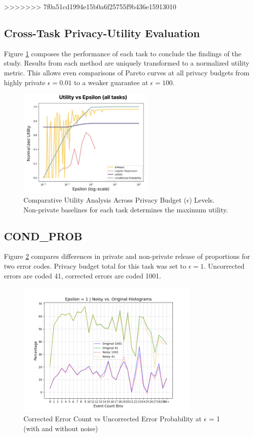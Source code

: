 \documentclass[12pt,letterpaper]{article}
\begin{document}
>>>>>>> 7f0a51cd1994e15b0a6f25755f9b436e15913010

\subsection{Cross-Task Privacy-Utility Evaluation}

Figure \ref{fig:meta} composes the performance of each task to conclude the findings of the study. Results from each method are uniquely transformed to a normalized utility metric. This allows even comparisons of Pareto curves at all privacy budgets from highly private $\epsilon=0.01$ to a weaker guarantee at $\epsilon=100$.

\begin{figure}[H]
  \centering
  \includegraphics[width=0.6\textwidth]{figure/meta.png}
  \caption{Comparative Utility Analysis Across Privacy Budget ($\epsilon$) Levels. Non-private baselines for each task determines the maximum utility.}
  \label{fig:meta}
\end{figure}

\subsection{COND\_PROB}

Figure \ref{fig:histoeps} compares differences in private and non-private release of proportions for two error codes. Privacy budget total for this task was set to $\epsilon=1$. Uncorrected errors are coded 41, corrected errors are coded 1001. 

\begin{figure}[H]
    \centering
    \includegraphics[width=0.8\textwidth]{figure/histoeps1.png}
    \caption{Corrected Error Count vs Uncorrected Error Probability at $\epsilon$ = 1 (with and without noise)}
    \label{fig:histoeps}
\end{figure}
\end{document}

